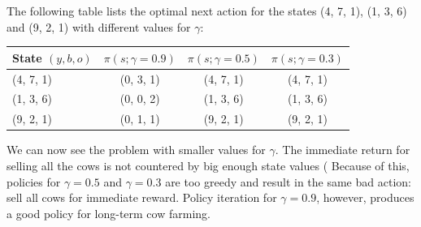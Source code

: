 \documentclass[a4paper]{article}
\begin{document}
The following table lists the optimal next action for the states (4, 7, 1), 
(1, 3, 6) and (9, 2, 1) with different values for $\gamma$:

\begin{tabular}{ l | c | c | c }
State $(y, b, o)$ & $\pi(s; \gamma = 0.9)$ & $\pi(s; \gamma = 0.5)$ & $\pi(s; \gamma = 0.3)$ \\
\hline
(4, 7, 1) & (0, 3, 1) & (4, 7, 1) & (4, 7, 1) \\ 
\hline
(1, 3, 6) & (0, 0, 2) & (1, 3, 6) & (1, 3, 6) \\
\hline
(9, 2, 1) & (0, 1, 1) & (9, 2, 1) & (9, 2, 1) \\
\end{tabular}

We can now see the problem with smaller values for $\gamma$. The immediate return for selling all the cows is not countered by big enough state values (
Because of this, policies for $\gamma = 0.5$ and $\gamma = 0.3$ are too greedy and result in the same bad action: sell all cows for immediate reward.
Policy iteration for $\gamma = 0.9$, however, produces a good policy for long-term cow farming.
\end{document}
